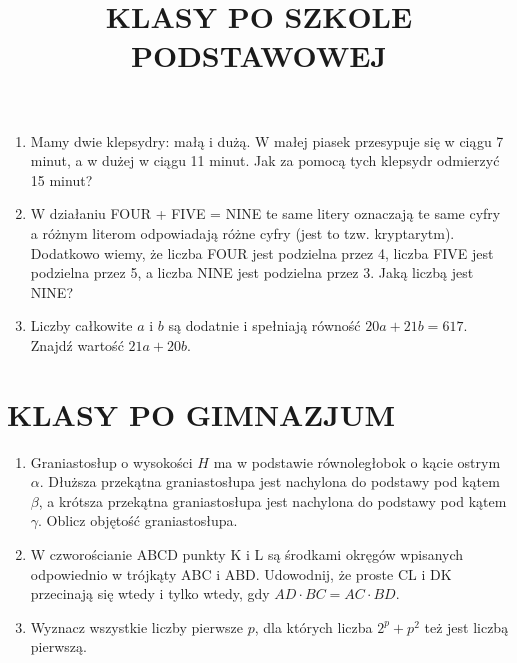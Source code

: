 \documentclass[10pt]{article}
\title{KLASY PO SZKOLE PODSTAWOWEJ }
\author{}
\date{}
\begin{document}
\maketitle
\begin{enumerate}
  \item Mamy dwie klepsydry: małą i dużą. W małej piasek przesypuje się w ciągu 7 minut, a w dużej w ciągu 11 minut. Jak za pomocą tych klepsydr odmierzyć 15 minut?
  \item W działaniu FOUR + FIVE = NINE te same litery oznaczają te same cyfry a różnym literom odpowiadają różne cyfry (jest to tzw. kryptarytm). Dodatkowo wiemy, że liczba FOUR jest podzielna przez 4, liczba FIVE jest podzielna przez 5, a liczba NINE jest podzielna przez 3. Jaką liczbą jest NINE?
  \item Liczby całkowite \(a\) i \(b\) są dodatnie i spełniają równość \(20 a+21 b=617\). Znajdź wartość \(21 a+20 b\).
\end{enumerate}

\section*{KLASY PO GIMNAZJUM}
\begin{enumerate}
  \item Graniastosłup o wysokości \(H\) ma w podstawie równoległobok o kącie ostrym \(\alpha\). Dłuższa przekątna graniastosłupa jest nachylona do podstawy pod kątem \(\beta\), a krótsza przekątna graniastosłupa jest nachylona do podstawy pod kątem \(\gamma\). Oblicz objętość graniastosłupa.
  \item W czworościanie ABCD punkty K i L są środkami okręgów wpisanych odpowiednio w trójkąty ABC i ABD. Udowodnij, że proste CL i DK przecinają się wtedy i tylko wtedy, gdy \(A D \cdot B C=A C \cdot B D\).
  \item Wyznacz wszystkie liczby pierwsze \(p\), dla których liczba \(2^{p}+p^{2}\) też jest liczbą pierwszą.
\end{enumerate}
\end{document}
